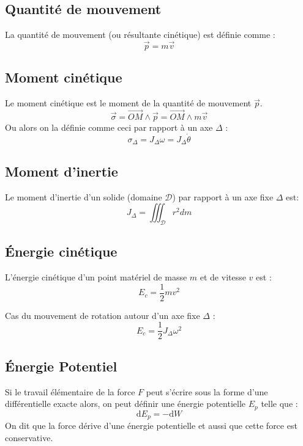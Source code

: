 \documentclass[a4paper,12pt]{article}
\newcommand{\diff}{\mathrm{d}} %
\renewcommand{\vec}{\overrightarrow}  %
\begin{document}
    \begin{multicols}{2}
        
        \subsection{Quantité de mouvement}
            La quantité de mouvement (ou résultante cinétique) est définie comme :
                $$\vec{p} = m \vec{v}$$

        \subsection{Moment cinétique}
            Le moment cinétique est le moment de la quantité de mouvement $\vec{p}$.
                $$ \vec \sigma = \vec{OM} \wedge \vec p = \vec{OM} \wedge m \vec v $$
            Ou alors on la définie comme ceci par rapport à un axe $\Delta$ :
                $$ \sigma_\Delta = J_\Delta \omega = J_\Delta \dot \theta $$ 
        
        \subsection{Moment d'inertie}
            Le moment d'inertie d'un solide (domaine $\mathcal{D}$) par rapport à un axe fixe $\Delta$ est:
                $$ J_\Delta = \iiint_{\mathcal{D}} r^2 dm $$



        \subsection{Énergie cinétique}
            L'énergie cinétique d'un point matériel de masse $m$ et de vitesse $v$ est : 
                $$ E_c = \frac{1}{2} m v^2 $$

            Cas du mouvement de rotation autour d'un axe fixe $\Delta$ :
                $$ E_c = \frac{1}{2} J_\Delta \omega^2 $$

        \subsection{Énergie Potentiel}

            Si le travail élémentaire de la force $F$ peut s'écrire sous la
            forme d'une différentielle exacte alors, on peut définir
            une énergie potentielle $E_p$ telle que :
            $$ \diff E_p = -\diff W $$
            On dit que la force dérive d'une énergie potentielle et 
            aussi que cette force est conservative.


\end{multicols}
\end{document}
